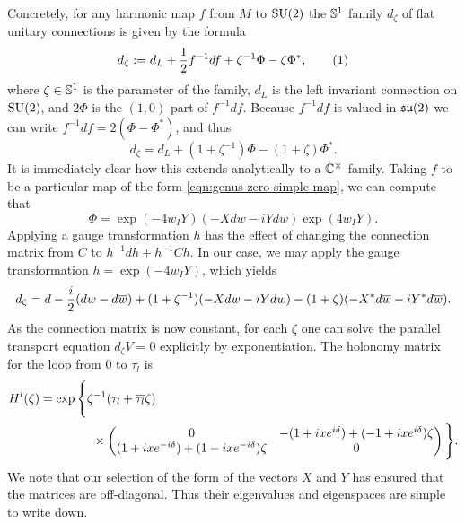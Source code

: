 \documentclass{article}
\begin{document}
Concretely, for any harmonic map $f$ from $M$ to $\SU(2)$ the $\S^1$ family $d_\zeta$ of flat unitary connections is given by the formula
\[
d_\zeta := d_L + \frac{1}{2}f^{-1}df + \zeta^{-1}\Phi - \zeta\Phi^*,
\labelthis{eqn:flat connection translation}
\]
where $\zeta\in\S^1$ is the parameter of the family, $d_L$ is the left invariant connection on $\SU(2)$, and $2\Phi$ is the $(1,0)$ part of $f^{-1}df$. Because $f^{-1}df$ is valued in $\su(2)$ we can write $f^{-1}df = 2(\Phi - \Phi^*)$, and thus
\[
d_\zeta = d_L + (1+\zeta^{-1})\Phi - (1+\zeta)\Phi^*.
\]
It is immediately clear how this extends analytically to a $\C^\times$ family. Taking $f$ to be a particular map of the form \eqref{eqn:genus zero simple map}, we can compute that
\[
\Phi = \exp(-4w_I Y)(-Xdw -iYdw)\exp(4w_I Y).
\]
Applying a gauge transformation $h$ has the effect of changing the connection matrix from $C$ to $h^{-1}dh + h^{-1}Ch$. In our case, we may apply the gauge transformation $h = \exp(-4 w_I Y)$, which yields
\[
d_\zeta = d -\frac{\iu}{2}(dw - d\bar{w}) + (1+\zeta^{-1})(-Xdw -iYdw) - (1+\zeta)(-X^*d\bar{w} -iY^*d\bar{w}).
\]
As the connection matrix is now constant, for each $\zeta$ one can solve the parallel transport equation $d_\zeta V = 0$ explicitly by exponentiation.
The holonomy matrix for the loop from $0$ to $\tau_l$ is
\begin{align*}
H^l(\zeta)
&= \exp \Bigg\{ \zeta^{-1}(\tau_l + \bar{\tau_l}\zeta)  \\
&\hspace{1.5cm}\times\begin{pmatrix}
0 & - (1 + \iu xe^{\iu \delta}) + (-1 + \iu x e^{\iu \delta})\zeta \\
(1+\iu xe^{-\iu \delta}) + (1-\iu xe^{-\iu \delta})\zeta & 0
\end{pmatrix}\Bigg\}.
\end{align*}
We note that our selection of the form of the vectors $X$ and $Y$ has ensured that the matrices are off-diagonal. Thus their eigenvalues and eigenspaces are simple to write down.
\end{document}

